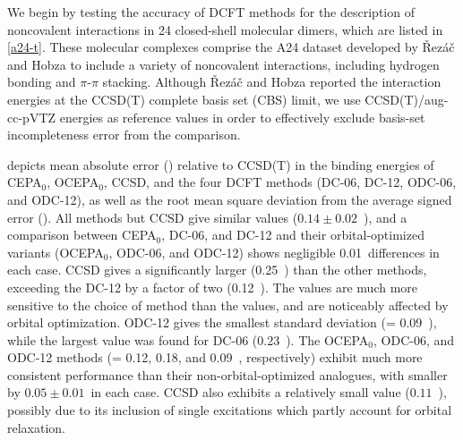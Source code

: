 {    
}


We begin by testing the accuracy of DCFT methods for the description of
noncovalent interactions in 24 closed-shell molecular dimers, which are listed
in \cref{a24-t}.
These molecular complexes comprise the A24 dataset\cite{Rezac:2013p2151}
developed by \v{R}ez\'a\v{c} and Hobza to include a variety of noncovalent
interactions, including hydrogen bonding and $\pi$-$\pi$ stacking.
Although \v{R}ez\'a\v{c} and Hobza reported the interaction energies at the
CCSD(T) complete basis set (CBS) limit, we use CCSD(T)/aug-cc-pVTZ energies as
reference values in order to effectively exclude basis-set incompleteness error
from the comparison.

 depicts mean absolute error (\mae) relative to CCSD(T) in the
binding energies of CEPA$_0$, OCEPA$_0$, CCSD, and the four DCFT methods (DC-06,
DC-12, ODC-06, and ODC-12), as well as the root mean square deviation from the
average signed error (\std).
All methods but CCSD give similar \mae values ($0.14\pm 0.02$~\kcal), and a
comparison between CEPA$_0$, DC-06, and DC-12 and their orbital-optimized
variants (OCEPA$_0$, ODC-06, and ODC-12) shows negligible 0.01~\kcal differences
in each case.
CCSD gives a significantly larger \mae (0.25~\kcal) than the other methods,
exceeding the DC-12 \mae by a factor of two (0.12~\kcal).
The \std values are much more sensitive to the choice of method than the \mae
values, and are noticeably affected by orbital optimization.
ODC-12 gives the smallest standard deviation (\std = 0.09~\kcal), while the
largest \std value was found for DC-06 (0.23~\kcal). The OCEPA$_0$, ODC-06, and
ODC-12 methods (\std = 0.12, 0.18, and 0.09~\kcal, respectively) exhibit much
more consistent performance than their non-orbital-optimized analogues, with
\std smaller by $0.05\pm 0.01$~\kcal in each case.
CCSD also exhibits a relatively small \std value ($0.11$~\kcal), possibly due to
its inclusion of single excitations which partly account for orbital relaxation.

